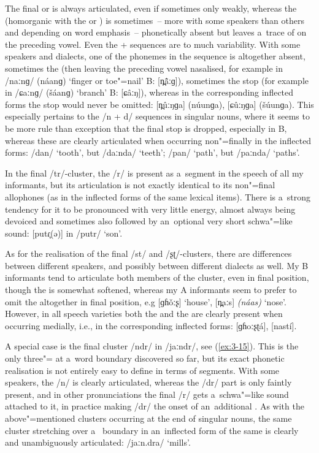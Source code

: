 The final  or  is always articulated, even if sometimes only weakly, whereas the
 (homorganic with the  or ) is sometimes~-- more with some speakers than
others and depending on word emphasis~-- phonetically absent but leaves a~trace of  on
the preceding vowel. Even the  +  sequences are  to much variability. With some
speakers and dialects, one of the phonemes in the sequence is altogether absent, sometimes the 
(then leaving the preceding vowel nasalised, for example in /naːnɡ/
(náanɡ) `finger or toe"=nail' B: [n̪\^{ã}ːɡ]), sometimes the stop (for example in /ɕaːnɡ/ (\v{s}áanɡ)
`branch' B: [ɕâːŋ]), whereas in the corresponding inflected forms the stop would never be
omitted: [n̪ûːŋɡa] (núunɡa), [ɕûːŋɡa]
(\v{s}úunɡa). This especially pertains to the /n +
d/ sequences in singular nouns, where it seems to be more rule than exception that the final stop is dropped, especially in B, whereas these are clearly articulated when occurring non"=finally in the inflected forms: /dan/ `tooth', but /daːnda/ `teeth'; /pan/ `path', but /paːnda/ `paths'.


In the final /tr/-cluster, the /r/ is present as a~segment in the speech of all my informants, but its articulation is not exactly identical to its non"=final allophones (as in the inflected forms of the same lexical items). There is a~strong tendency for it to be pronounced with very little energy, almost always being devoiced and sometimes also followed by an~optional very short schwa"=like sound: [putɾ̥(ə)] in /putr/ `son'. 


As for the realisation of the final /st/ and /ʂʈ/-clusters, there are differences between different speakers, and possibly between different dialects as well. My B informants tend to articulate both members of the cluster, even in final position, though the  is somewhat softened, whereas my A informants seem to prefer to omit the  altogether in final position, e.g [ɡɦ\v{o}ːʂ] `house', [n̪aːs] \textit{(náas)} `nose'. However, in all speech varieties both the  and the  are clearly present when occurring medially, i.e., in the corresponding inflected forms: [ɡɦoːʂʈá], [nastí].


A special case is the final cluster /ndr/ in /jaːndr/, see (\ref{ex:3-15}). This is the only three"= at a~word boundary discovered so far, but its exact phonetic realisation is not entirely easy to define in terms of segments. With some speakers, the /n/ is clearly articulated, whereas the /dr/ part is only faintly present, and in other pronunciations the final /r/ gets a~schwa"=like sound attached to it, in practice making /dr/ the onset of an~additional . As with the above"=mentioned clusters occurring at the end of singular nouns, the same cluster stretching over a~ boundary in an~inflected form of the same  is clearly and unambiguously articulated: /jaːn.dra/ `mills'.


